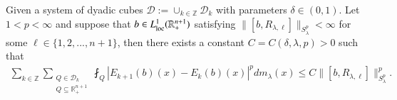 \documentclass[12pt]{amsart}
\begin{document}
\begin{lemma}\label{step1}
Given a
system of dyadic cubes $\mathcal{D}
    := \cup_{k\in\mathbb{Z}}\mathcal{D}_{k}$ with parameters $\delta\in(0,1)$.  Let $1<p<\infty$ and suppose that $b\in L_{{\rm loc}}^1(\mathbb{R}_{+}^{n+1})$  satisfying $\|[b,R_{\lambda,\ell}]\|_{S_\lambda^p}<\infty$ for some $\ell\in\{1,2,...,n+1\}$, then there exists a constant $C=C(\delta,\lambda,p)>0$ such that
    \begin{align} \label{e:step1}
\sum_{k\in\mathbb{Z}}\sum_{\substack{Q\in\mathcal{D}_{k}\\Q\subseteq \mathbb{R}_+^{n+1}}}\fint_{Q}|E_{k+1}(b)(x)-E_{k}(b)(x)|^{p}dm_\lambda(x) \leq C \|[b,R_{\lambda,\ell}]\|_{S_\lambda^p}^p.
\end{align}
\end{lemma}
\end{document}
